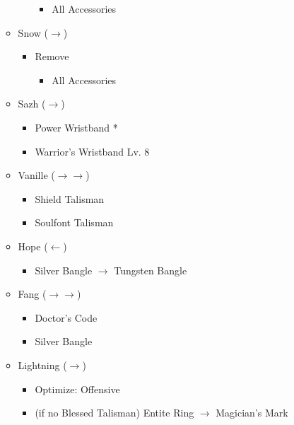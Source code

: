\begin{paracol}{2}
\begin{menu}
\begin{itemize}
\begin{itemize}
\begin{itemize}
					            \begin{itemize}
						            \item All Accessories
					            \end{itemize}
				      \end{itemize}
				\item Snow ($\rightarrow$)
				      \begin{itemize}
					      \item Remove
					            \begin{itemize}
						            \item All Accessories
					            \end{itemize}
				      \end{itemize}
				\item Sazh ($\rightarrow$)
				      \begin{itemize}
					      \item Power Wristband *
					      \item Warrior's Wristband Lv. 8
				      \end{itemize}
				\item Vanille ($\rightarrow\rightarrow$)
				      \begin{itemize}
					      \item Shield Talisman
					      \item Soulfont Talisman
				      \end{itemize}
				\item Hope ($\leftarrow$)
				      \begin{itemize}
					      \item Silver Bangle $\rightarrow$ Tungsten Bangle
				      \end{itemize}
				\item Fang ($\rightarrow\rightarrow$)
				      \begin{itemize}
					      \item Doctor's Code
					      \item Silver Bangle
				      \end{itemize}
				\item Lightning ($\rightarrow$)
				      \begin{itemize}
					      \item Optimize: Offensive
					      \item (if no Blessed Talisman) Entite Ring $\rightarrow$ Magician's Mark
				      \end{itemize}
			\end{itemize}

\end{itemize}
\end{menu}
\end{paracol}
